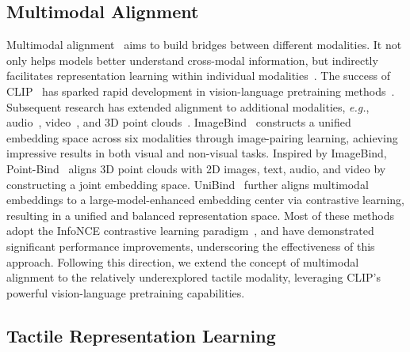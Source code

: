 \documentclass[letterpaper]{article} %
\theoremstyle{definition}                %
\theoremstyle{plain}                     %
\theoremstyle{remark}                    %
\begin{document}
\subsection{Multimodal Alignment}
\label{sec:multimodal}
Multimodal alignment~\cite{baltruvsaitis2018multimodal,xu2023multimodal} aims to build bridges between different modalities. It not only helps models better understand cross-modal information, but indirectly facilitates representation learning within individual modalities~\cite{zhou2025revisiting, zhou2025disentangled, zhou2025cuff, zhang2024vision}. The success of CLIP~\cite{radford2021learning} has sparked rapid development in vision-language pretraining methods~\cite{jia2021scaling,alayrac2022flamingo,li2023scaling,zhao2023mmicl}. Subsequent research has extended alignment to additional modalities, \textit{e.g.}, audio~\cite{guzhov2022audioclip}, video~\cite{ma2022x}, and 3D point clouds~\cite{xue2023ulip}. ImageBind~\cite{girdhar2023imagebind} constructs a unified embedding space across six modalities through image-pairing learning, achieving impressive results in both visual and non-visual tasks. Inspired by ImageBind, Point-Bind~\cite{guo2023point} aligns 3D point clouds with 2D images, text, audio, and video by constructing a joint embedding space. UniBind~\cite{lyu2024unibind} further aligns multimodal embeddings to a large-model-enhanced embedding center via contrastive learning, resulting in a unified and balanced representation space. Most of these methods adopt the InfoNCE contrastive learning paradigm~\cite{oord2018representation}, and have demonstrated significant performance improvements, underscoring the effectiveness of this approach. Following this direction, we extend the concept of multimodal alignment to the relatively underexplored tactile modality, leveraging CLIP’s powerful vision-language pretraining capabilities.


\subsection{Tactile Representation Learning}
\label{sec:tactile}
\end{document}
